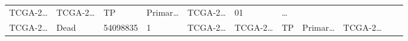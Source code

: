 \documentclass[
]{article}
\begin{document}
\begin{longtable}[]{@{}lllllllllll@{}}
\begin{minipage}[t]{0.07\columnwidth}
TCGA-2\ldots{}\strut
\end{minipage} & \begin{minipage}[t]{0.07\columnwidth}\raggedright
TCGA-2\ldots{}\strut
\end{minipage} & \begin{minipage}[t]{0.07\columnwidth}\raggedright
TP\strut
\end{minipage} & \begin{minipage}[t]{0.07\columnwidth}\raggedright
Primar\ldots{}\strut
\end{minipage} & \begin{minipage}[t]{0.09\columnwidth}\raggedright
TCGA-2\ldots{}\strut
\end{minipage} & \begin{minipage}[t]{0.10\columnwidth}\raggedright
01\strut
\end{minipage} & \begin{minipage}[t]{0.03\columnwidth}\raggedright
\ldots{}\strut
\end{minipage}\tabularnewline
\begin{minipage}[t]{0.07\columnwidth}\raggedright
TCGA-2\ldots{}\strut
\end{minipage} & \begin{minipage}[t]{0.04\columnwidth}\raggedright
Dead\strut
\end{minipage} & \begin{minipage}[t]{0.06\columnwidth}\raggedright
54098835\strut
\end{minipage} & \begin{minipage}[t]{0.07\columnwidth}\raggedright
1\strut
\end{minipage} & \begin{minipage}[t]{0.07\columnwidth}\raggedright
TCGA-2\ldots{}\strut
\end{minipage} & \begin{minipage}[t]{0.07\columnwidth}\raggedright
TCGA-2\ldots{}\strut
\end{minipage} & \begin{minipage}[t]{0.07\columnwidth}\raggedright
TP\strut
\end{minipage} & \begin{minipage}[t]{0.07\columnwidth}\raggedright
Primar\ldots{}\strut
\end{minipage} & \begin{minipage}[t]{0.09\columnwidth}\raggedright
TCGA-2\ldots{}\strut
\end{minipage} & \begin{minipage}[t]{0.10\columnwidth}\raggedright

\end{minipage}
\end{longtable}
\end{document}

